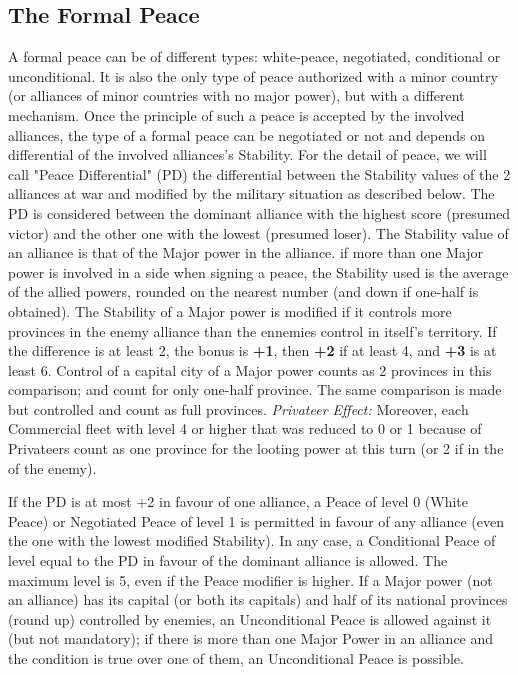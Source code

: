 \subsection{The Formal Peace}

\aparag A formal peace can be of different types: white-peace, negotiated,
conditional or unconditional.
\bparag It is also the only type of peace authorized with a minor country (or
alliances of minor countries with no major power), but with a different
mechanism.
\bparag Once the principle of such a peace is accepted by the involved
alliances, the type of a formal peace can be negotiated or not and depends on
differential of the involved alliances's Stability.
For the detail of peace, we will call "Peace Differential" (PD) the
differential between the Stability values of the 2 alliances at war and
modified by the military situation as described below.  The PD is considered
between the dominant alliance with the highest score (presumed victor) and the
other one with the lowest (presumed loser). The Stability value of an alliance
is that of the Major power in the alliance.
if more than one Major power is involved in a side when signing a peace, the
Stability used is the average of the allied powers, rounded on the nearest
number (and down if one-half is obtained).
The Stability of a Major power is modified if it controls more provinces in
the enemy alliance than the ennemies control in itself's territory.  If the
difference is at least 2, the bonus is {\bf +1}, then {\bf +2} if at least 4,
and {\bf +3} is at least 6. Control of a capital city of a Major power counts
as 2 provinces in this comparison; \COL and \TP count for only one-half
province.
\label{chPeace:Privateer Effect}
The same comparison is made but controlled \COL and \TP count as full
provinces.  \textit{Privateer Effect:} Moreover, each Commercial fleet with
level 4 or higher that was reduced to 0 or 1 because of Privateers count as
one province for the looting power at this turn (or 2 if in the \CTZ of the
enemy).

\bparag If the PD is at most +2 in favour of one alliance, a Peace of level 0
(White Peace) or Negotiated Peace of level 1 is permitted in favour of any
alliance (even the one with the lowest modified Stability).
\bparag In any case, a Conditional Peace of level equal to the PD in favour of
the dominant alliance is allowed. The maximum level is 5, even if the Peace
modifier is higher.
\bparag If a Major power (not an alliance) has its capital (or both its
capitals) and half of its national provinces (round up) controlled by enemies,
an Unconditional Peace is allowed against it (but not mandatory); if there is
more than one Major Power in an alliance and the condition is true over one of
them, an Unconditional Peace is possible.

